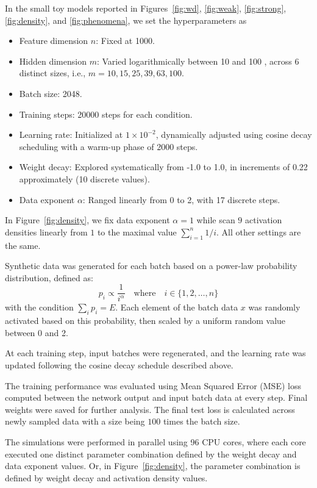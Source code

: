 \documentclass{article}
\begin{document}
In the small toy models reported in Figures~\ref{fig:wd}, \ref{fig:weak}, \ref{fig:strong}, \ref{fig:density}, and \ref{fig:phenomena}, we set the hyperparameters as
\begin{itemize}
    \item Feature dimension \( n \): Fixed at 1000.
    \item Hidden dimension \( m \): Varied logarithmically between 10 and 100 , across 6 distinct sizes, i.e., $m = 10,  15,  25,  39,  63, 100$.
    \item Batch size: 2048.
    \item Training steps: 20000 steps for each condition.
    \item Learning rate: Initialized at \(1 \times 10^{-2}\), dynamically adjusted using cosine decay scheduling with a warm-up phase of 2000 steps.
    \item Weight decay: Explored systematically from -1.0 to 1.0, in increments of 0.22 approximately (10 discrete values).
    \item Data exponent \(\alpha\): Ranged linearly from 0 to 2, with 17 discrete steps.
\end{itemize}
In Figure~\ref{fig:density}, we fix data exponent \(\alpha = 1\) while scan $9$ activation densities linearly from $1$ to the maximal value $\sum_{i=1}^n 1/i$. All other settings are the same.

Synthetic data was generated for each batch based on a power-law probability distribution, defined as:
\[
p_i \propto \frac{1}{i^{\alpha}} \quad \text{where} \quad i \in \{1, 2, \dots, n\}
\]
with the condition \(\sum_i p_i = E\). Each element of the batch data \(x\) was randomly activated based on this probability, then scaled by a uniform random value between 0 and 2.

At each training step, input batches were regenerated, and the learning rate was updated following the cosine decay schedule described above.

The training performance was evaluated using Mean Squared Error (MSE) loss computed between the network output and input batch data at every step. Final weights were saved for further analysis. The final test loss is calculated across newly sampled data with a size being $100$ times the batch size. 

The simulations were performed in parallel using 96 CPU cores, where each core executed one distinct parameter combination defined by the weight decay and data exponent values. Or, in Figure~\ref{fig:density}, the parameter combination is defined by weight decay and activation density values.
\end{document}
